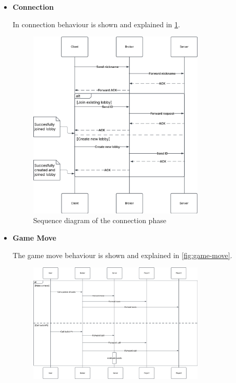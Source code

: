 \documentclass{scrartcl}
\begin{document}
\begin{itemize}
      \item \textbf{Connection} \par
            In connection behaviour is shown and explained in \cref{fig:connection}.
            \begin{figure}
                  \centering
                  \includegraphics[width=0.8\textwidth]{figures/sequenceConnection.png}
                  \caption{Sequence diagram of the connection phase}
                  \label{fig:connection}
            \end{figure}
      \item \textbf{Game Move} \par
            The game move behaviour is shown and explained in \cref{fig:game-move}.
            \begin{figure}
                  \centering
                  \includegraphics[width=0.8\textwidth]{figures/sequenceGameMove.png}

\end{figure}
\end{itemize}
\end{document}
